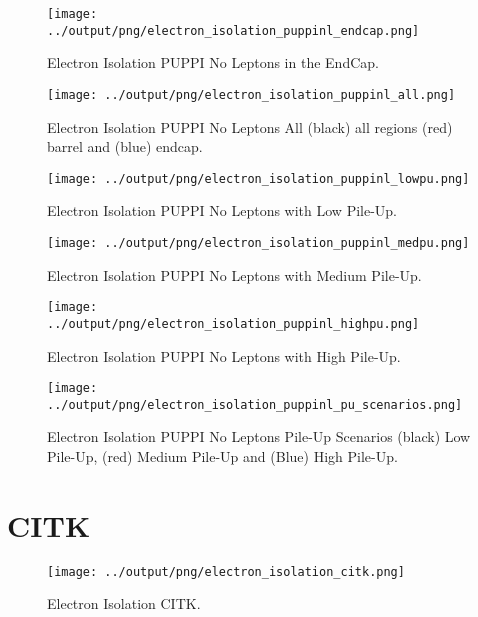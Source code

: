 \documentclass[11pt]{book}
\begin{document}
\begin{figure}[htbp]
\centering
\texttt{[image: ../output/png/electron\_isolation\_puppinl\_endcap.png]}
\caption{Electron Isolation PUPPI No Leptons in the EndCap.}
\label{fig:electron_isolation_puppinl_endcap}
\end{figure}

\begin{figure}[htbp]
\centering
\texttt{[image: ../output/png/electron\_isolation\_puppinl\_all.png]}
\caption{Electron Isolation PUPPI No Leptons All (black) all regions (red) barrel and (blue) endcap.}
\label{fig:electron_isolation_puppinl_all}
\end{figure}

\begin{figure}[htbp]
\centering
\texttt{[image: ../output/png/electron\_isolation\_puppinl\_lowpu.png]}
\caption{Electron Isolation PUPPI No Leptons with Low Pile-Up.}
\label{fig:electron_isolation_puppinl_lowpu}
\end{figure}

\begin{figure}[htbp]
\centering
\texttt{[image: ../output/png/electron\_isolation\_puppinl\_medpu.png]}
\caption{Electron Isolation PUPPI No Leptons with Medium Pile-Up.}
\label{fig:electron_isolation_puppinl_medpu}
\end{figure}

\begin{figure}[htbp]
\centering
\texttt{[image: ../output/png/electron\_isolation\_puppinl\_highpu.png]}
\caption{Electron Isolation PUPPI No Leptons with High Pile-Up.}
\label{fig:electron_isolation_puppinl_highpu}
\end{figure}

\begin{figure}[htbp]
\centering
\texttt{[image: ../output/png/electron\_isolation\_puppinl\_pu\_scenarios.png]}
\caption{Electron Isolation PUPPI No Leptons Pile-Up Scenarios (black) Low Pile-Up, (red) Medium Pile-Up and (Blue) High Pile-Up.}
\label{fig:electron_isolation_puppinl_pu_scenarios}
\end{figure}
\clearpage

\chapter{CITK}
\begin{figure}[htbp]
\centering
\texttt{[image: ../output/png/electron\_isolation\_citk.png]}
\caption{Electron Isolation CITK.}
\label{fig:electron_isolation_citk}
\end{figure}
\end{document}
